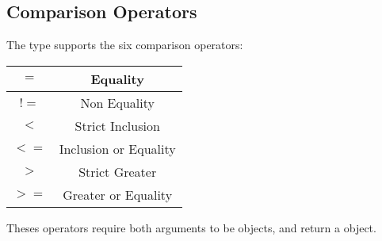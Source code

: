 \subsection{Comparison Operators}

The  type supports the six comparison operators:\newline

\begin{tabular}{|c|c|}
\hline
$=$ & Equality \\
\hline
$!=$ & Non Equality \\
\hline
$<$  & Strict Inclusion \\
\hline
$<=$  & Inclusion or Equality \\
\hline
$>$  & Strict Greater \\
\hline
$>=$  & Greater or Equality \\
\hline
\end{tabular}

Theses operators require both arguments to be  objects, and return a  object.



